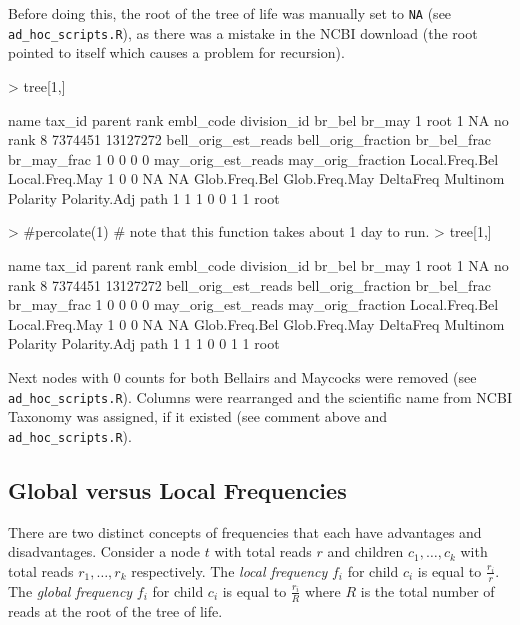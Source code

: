 \documentclass{article}
\begin{document}
Before doing this, the root of the tree of life was manually set to {\tt NA} (see {\tt ad\_hoc\_scripts.R}),
as there was a mistake in the NCBI download (the root pointed to itself which causes
a problem for recursion).
\begin{Schunk}
\begin{Sinput}
> tree[1,]
\end{Sinput}
\begin{Soutput}
  name tax_id parent    rank embl_code division_id  br_bel   br_may
1 root      1     NA no rank                     8 7374451 13127272
  bell_orig_est_reads bell_orig_fraction br_bel_frac br_may_frac
1                   0                  0           0           0
  may_orig_est_reads may_orig_fraction Local.Freq.Bel Local.Freq.May
1                  0                 0             NA             NA
  Glob.Freq.Bel Glob.Freq.May DeltaFreq Multinom Polarity Polarity.Adj path
1             1             1         0        0        1            1 root
\end{Soutput}
\begin{Sinput}
> #percolate(1)  # note that this function takes about 1 day to run.
> tree[1,]
\end{Sinput}
\begin{Soutput}
  name tax_id parent    rank embl_code division_id  br_bel   br_may
1 root      1     NA no rank                     8 7374451 13127272
  bell_orig_est_reads bell_orig_fraction br_bel_frac br_may_frac
1                   0                  0           0           0
  may_orig_est_reads may_orig_fraction Local.Freq.Bel Local.Freq.May
1                  0                 0             NA             NA
  Glob.Freq.Bel Glob.Freq.May DeltaFreq Multinom Polarity Polarity.Adj path
1             1             1         0        0        1            1 root
\end{Soutput}
\end{Schunk}

Next nodes with 0 counts for both Bellairs and Maycocks were removed (see {\tt ad\_hoc\_scripts.R}).
Columns were rearranged and the scientific name from NCBI Taxonomy was assigned, if it existed (see comment
above and {\tt ad\_hoc\_scripts.R}).

\subsection{Global versus Local Frequencies}

There are two distinct concepts of frequencies that each have advantages and disadvantages.
Consider a node $t$ with total reads $r$ and children $c_1, \ldots, c_k$ with total reads $r_1, \ldots, r_k$ respectively.
The {\em local frequency} $f_i$ for child $c_i$ is equal to $\frac{r_i}{r}$. 
The {\em global frequency} $f_i$ for child $c_i$ is equal to $\frac{r_i}{R}$ where $R$ is the total number of reads
at the root of the tree of life.
\end{document}
